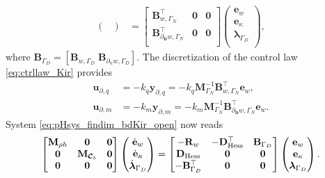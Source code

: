 \begin{equation}
\begin{aligned}
\begin{pmatrix}
\end{pmatrix}
&= \begin{bmatrix}
\mathbf{B}_{w, \Gamma_N}^\top & \mathbf{0} &  \mathbf{0} \\
\mathbf{B}_{\partial_{\bm{n}} w, \Gamma_N}^\top & \mathbf{0} & \mathbf{0} \\
\end{bmatrix}
\begin{pmatrix}
{\mathbf{e}}_{w} \\
{\mathbf{e}}_{\kappa} \\
{\bm{\lambda}}_{\Gamma_D} \\
\end{pmatrix},
\end{aligned}
\end{equation}
where $\mathbf{B}_{\Gamma_D} = [\mathbf{B}_{w, \Gamma_D} \; \mathbf{B}_{\partial_n w, \Gamma_D}]$. The discretization of the control law \eqref{eq:ctrllaw_Kir} provides
\begin{equation}
\begin{aligned}
\mathbf{u}_{\partial, q} &= -k_q \mathbf{y}_{\partial, q} = - k_q \mathbf{M}_{\Gamma_N}^{-1} \mathbf{B}_{w, \Gamma_N}^\top \mathbf{e}_w, \\
\mathbf{u}_{\partial, m} &= -k_m \mathbf{y}_{\partial, m} = - k_m \mathbf{M}_{\Gamma_N}^{-1} \mathbf{B}_{\partial_{\bm{n}} w, \Gamma_N}^\top \mathbf{e}_w.
\end{aligned}
\end{equation}
System \eqref{eq:pHsys_findim_bdKir_open} now reads
\begin{equation}
\begin{bmatrix}
\mathbf{M}_{\rho h} & \mathbf{0} & \mathbf{0}\\
\mathbf{0} & \mathbf{M}_{\bm{\mathcal{C}}_b} & \mathbf{0}\\
\mathbf{0} & \mathbf{0} & \mathbf{0}\\
\end{bmatrix}
\begin{pmatrix}
\dot{\mathbf{e}}_{w} \\
\dot{\mathbf{e}}_{\kappa} \\
\dot{\bm{\lambda}}_{\Gamma_D} \\
\end{pmatrix}
= \begin{bmatrix}
-\mathbf{R}_w  & - \mathbf{D}_{\operatorname*{Hess}}^\top & \mathbf{B}_{\Gamma_D}\\
\mathbf{D}_{\operatorname*{Hess}} & \mathbf{0} & \mathbf{0} \\
-\mathbf{B}_{\Gamma_D}^\top & \mathbf{0} & \mathbf{0} \\
\end{bmatrix} 
\begin{pmatrix}
{\mathbf{e}}_{w} \\
{\mathbf{e}}_{\kappa} \\
{\bm{\lambda}}_{\Gamma_D} \\
\end{pmatrix}.
\end{equation}
